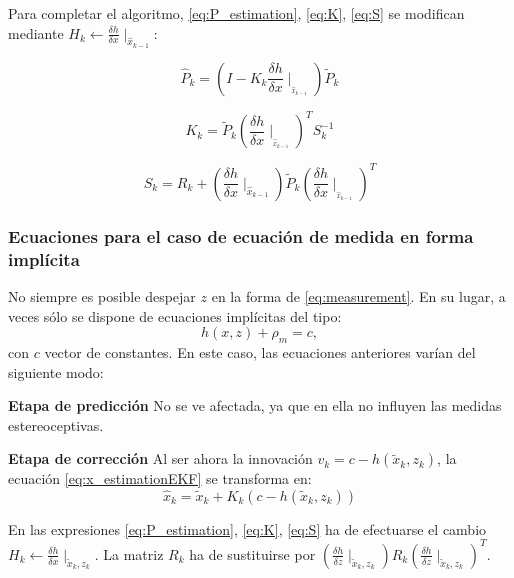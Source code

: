 Para completar el algoritmo,  \ref{eq:P_estimation}, \ref{eq:K}, \ref{eq:S} se modifican mediante $H_{k}\leftarrow \frac{\delta h}{\delta x}\mid_{\hat{x}_{k-1}}$:

\begin{equation}\label{eq:P_estimationEKF}
    \hat{P}_{k} = (I-K_{k}\frac{\delta h}{\delta x}\mid _{_{\hat{x}_{k-1}}})\tilde{P}_{k}
\end{equation}

\begin{equation}\label{eq:KEKF}
    K_{k} = \tilde{P}_{k}(\frac{\delta h}{\delta x}\mid _{_{\hat{x}_{k-1}}})^{T}S_{k}^{-1}
\end{equation}

\begin{equation}\label{eq:SEKF}
    S_{k} = R_{k}+(\frac{\delta h}{\delta x}\mid _{\hat{x}_{k-1}})\tilde{P}_{k} (\frac{\delta h}{\delta x}\mid _{_{\hat{x}_{k-1}}})^{T}
\end{equation}

\subsubsection{Ecuaciones para el caso de ecuación de medida en forma implícita}

No siempre es posible despejar $z$ en la forma de \ref{eq:measurement}. En su lugar, a veces sólo se dispone de ecuaciones implícitas del tipo:
\begin{equation}\label{eq:implicit}
    h(x,z)+\rho_{m}=c,
\end{equation}
con $c$ vector de constantes.
En este caso, las ecuaciones anteriores varían del siguiente modo:


\textbf{Etapa de predicción}
No se ve afectada, ya que en ella no influyen las medidas estereoceptivas.


\textbf{Etapa de corrección}
Al ser ahora la innovación $v_{k}=c-h(\tilde{x}_{k},z_{k})$, la ecuación \ref{eq:x_estimationEKF} se transforma en:
\begin{equation}\label{eq:x_estimationIm}
    \hat{x}_{k} = \tilde{x}_{k}+K_{k}(c-h(\tilde{x}_{k},z_{k}))
\end{equation}

En las expresiones \ref{eq:P_estimation}, \ref{eq:K}, \ref{eq:S} ha de efectuarse el cambio $H_{k}\leftarrow \frac{\delta h}{\delta x}\mid_{\tilde{x}_{k},z_{k}}$. La matriz $R_{k}$ ha de sustituirse por $(\frac{\delta h}{\delta z} \mid _{\tilde{x}_{k},z_{k}}) R_{k} (\frac{\delta h}{\delta z} \mid _{\tilde{x}_{k},z_{k}})^{T}$.

